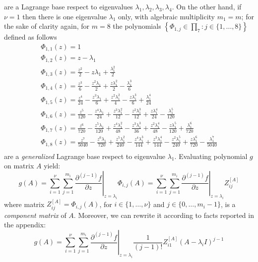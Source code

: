 are a Lagrange base respect to eigenvalues $\lambda_{1}, \lambda_{2},\lambda_{3},\lambda_{4}$.
On the other hand, if $\nu=1$ then there is one eigenvalue $\lambda_{1}$ only, with algebraic multiplicity $m_{1}=m$; for the sake of clarity again,
for $m=8$ the polynomials $\left\lbrace \Phi_{1,j}\in\prod_{7}:j\in\lbrace1,\ldots,8\rbrace \right\rbrace$ defined as follows
\begin{equation}
\begin{array}{c}
\Phi_{ 1, 1 }{\left (z \right )} = 1 \\ 
\Phi_{ 1, 2 }{\left (z \right )} = z - \lambda_{1} \\ 
\Phi_{ 1, 3 }{\left (z \right )} = \frac{z^{2}}{2} - z \lambda_{1} + \frac{\lambda_{1}^{2}}{2}\\ 
\Phi_{ 1, 4 }{\left (z \right )} = \frac{z^{3}}{6} - \frac{z^{2} \lambda_{1}}{2} + \frac{z \lambda_{1}^{2}}{2} - \frac{\lambda_{1}^{3}}{6} \\ 
\Phi_{ 1, 5 }{\left (z \right )} = \frac{z^{4}}{24} - \frac{z^{3} \lambda_{1}}{6} + \frac{z^{2} \lambda_{1}^{2}}{4} - \frac{z \lambda_{1}^{3}}{6} + \frac{\lambda_{1}^{4}}{24} \\ 
\Phi_{ 1, 6 }{\left (z \right )} = \frac{z^{5}}{120} - \frac{z^{4} \lambda_{1}}{24} + \frac{z^{3} \lambda_{1}^{2}}{12} - \frac{z^{2} \lambda_{1}^{3}}{12} + \frac{z \lambda_{1}^{4}}{24} - \frac{\lambda_{1}^{5}}{120} \\
\Phi_{ 1, 7 }{\left (z \right )} = \frac{z^{6}}{720} - \frac{z^{5} \lambda_{1}}{120} + \frac{z^{4} \lambda_{1}^{2}}{48} - \frac{z^{3} \lambda_{1}^{3}}{36} + \frac{z^{2} \lambda_{1}^{4}}{48} - \frac{z \lambda_{1}^{5}}{120} + \frac{\lambda_{1}^{6}}{720} \\ 
\Phi_{ 1, 8 }{\left (z \right )} = \frac{z^{7}}{5040} - \frac{z^{6} \lambda_{1}}{720} + \frac{z^{5} \lambda_{1}^{2}}{240} - \frac{z^{4} \lambda_{1}^{3}}{144} + \frac{z^{3} \lambda_{1}^{4}}{144} - \frac{z^{2} \lambda_{1}^{5}}{240} + \frac{z \lambda_{1}^{6}}{720} - \frac{\lambda_{1}^{7}}{5040}\\
\end{array}
\label{eq:generalized-Lagrange-base}
\end{equation}
are a \textit{generalized} Lagrange base respect to eigenvalue $\lambda_{1}$.
Evaluating polynomial $g$ on matrix $A$ yield:
\begin{displaymath}
g(A) = \sum_{i=1}^{\nu}{\sum_{j=1}^{m_{i}}{ \left.  \frac{\partial^{(j-1)}{f}}{\partial{z}} \right|_{z=\lambda_{i}}\Phi_{i,j}(A) }}
     = \sum_{i=1}^{\nu}{\sum_{j=1}^{m_{i}}{ \left.  \frac{\partial^{(j-1)}{f}}{\partial{z}} \right|_{z=\lambda_{i}}Z_{ij}^{[A]} }}
\end{displaymath}
where matrix $Z_{ij}^{[A]}=\Phi_{i,j}(A)$, for $i\in \lbrace 1, \ldots, \nu \rbrace$
and $j \in \lbrace 0, \ldots, m_{i}-1 \rbrace$, is a \textit{component matrix}
of $A$. Moreover, we can rewrite it according to facts reported in the appendix:
\begin{displaymath}
g(A) = \sum_{i=1}^{\nu}{\sum_{j=1}^{m_{i}}{ \left.  \frac{\partial^{(j-1)}{f}}{\partial{z}} \right|_{z=\lambda_{i}}\frac{1}{(j-1)!}{Z_{i1}^{[A]}(A-\lambda_{i}I)^{j-1}} }}
\end{displaymath}

